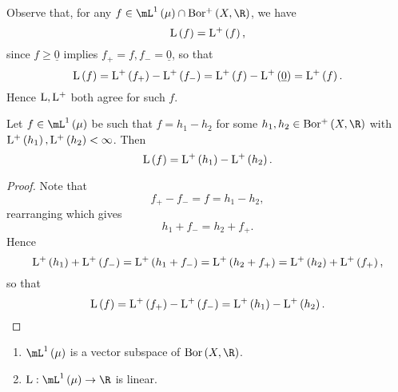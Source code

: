 \documentclass[pmath450]{subfiles}
\begin{document}
    Observe that, for any $f\in\lone\left( \mu \right)\cap\borplus\left( X,\R \right)$, we have
    \begin{equation*}
        \operatorname{L}\left( f \right) = \operatorname{L^+}\left( f \right),
    \end{equation*}
    since $f\geq\underline{0}$ implies $f_+=f, f_-=\underline{0}$, so that
    \begin{equation*}
        \operatorname{L}\left( f \right) = \operatorname{L^+}\left( f_+ \right) - \operatorname{L^+}\left( f_- \right) = \operatorname{L^+}\left( f \right) - \operatorname{L^+}\left( \underline{0} \right) = \operatorname{L^+}\left( f \right).
    \end{equation*}
    Hence $\operatorname{L},\operatorname{L^+}$ both agree for such $f$.
    
    \begin{lemma}{}
        Let $f\in\lone\left( \mu \right)$ be such that $f=h_1-h_2$ for some $h_1,h_2\in\borplus\left( X,\R \right)$ with $\operatorname{L^+}\left( h_1 \right),\operatorname{L^+}\left( h_2 \right)<\infty$. Then
        \begin{equation*}
            \operatorname{L}\left( f \right) = \operatorname{L^+}\left( h_1 \right)-\operatorname{L^+}\left( h_2 \right).
        \end{equation*}
    \end{lemma}

    \begin{proof}
        Note that
        \begin{equation*}
            f_+-f_- = f = h_1-h_2,
        \end{equation*}
        rearranging which gives
        \begin{equation*}
            h_1+f_- = h_2+f_+.
        \end{equation*}
        Hence
        \begin{equation*}
            \operatorname{L^+}\left( h_1 \right)+\operatorname{L^+}\left( f_- \right) = \operatorname{L^+}\left( h_1+f_- \right) = \operatorname{L^+}\left( h_2+f_+ \right) = \operatorname{L^+}\left( h_2 \right)+\operatorname{L^+}\left( f_+ \right),
        \end{equation*}
        so that
        \begin{equation*}
            \operatorname{L}\left( f \right) = \operatorname{L^+}\left( f_+ \right)-\operatorname{L^+}\left( f_- \right) = \operatorname{L^+}\left( h_1 \right)-\operatorname{L^+}\left( h_2 \right).
        \end{equation*}
    \end{proof}

    \begin{prop}{}
        \vspace{-11pt}
        \begin{enumerate}
            \item $\lone\left( \mu \right)$ is a vector subspace of $\bor\left( X,\R \right)$.
            \item $\lbor:\lone\left( \mu \right)\to\R$ is linear.
        \end{enumerate}
    \end{prop}
\end{document}
